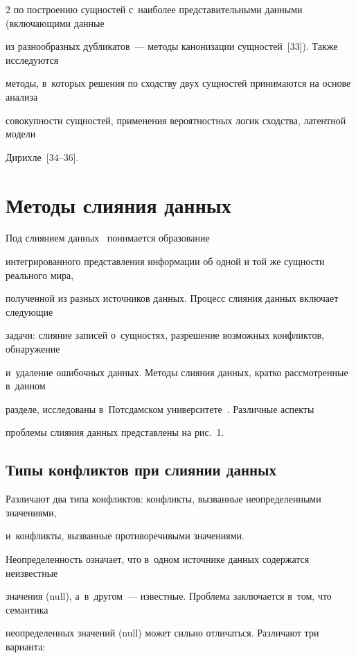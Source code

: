\begin{multicols}{2}
по построению сущностей с~наиболее представительными данными (включающими данные

из разнообразных дубликатов~--- методы канонизации сущностей~[33]). Также исследуются

методы, в~которых решения по сходству двух сущностей принимаются на основе анализа

совокупности сущностей, применения вероятностных логик сходства, латентной модели

Дирихле~[34--36].



\section{Методы слияния данных}



  Под слиянием данных~\cite{6-vov, 12-vov, 11-vov} понимается образование

интегрированного представления информации об одной и той же сущности реального мира,

полученной из разных источников данных. Процесс слияния данных включает следующие

задачи: слияние записей о~сущностях, разрешение возможных конфликтов, обнаружение

и~удаление ошибочных данных. Методы слияния данных, кратко рассмотренные в~данном

разделе, исследованы в~Потсдамском университете~\cite{11-vov}. Различные аспекты

проблемы слияния данных представлены на рис.~1.





  \subsection{Типы конфликтов при слиянии данных}



  Различают два типа конфликтов: конфликты, вызванные неопределенными значениями,

и~конфликты, вызванные противоречивыми значе\-ниями.



  Неопределенность означает, что в~одном источнике данных содержатся неизвестные

значения (null), а~в~другом~--- известные. Проблема заключается в~том, что семантика

неопределенных значений (null) может сильно отличаться. Различают три варианта:


\end{multicols}
